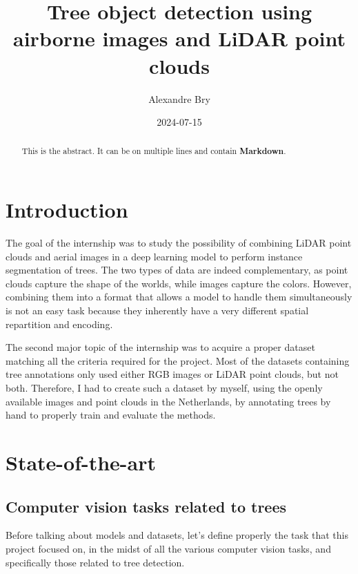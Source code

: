 \documentclass[
]{report}
\title{Tree object detection using airborne images and LiDAR point
clouds}
\author{Alexandre Bry}
\date{2024-07-15}
\renewcommand*\contentsname{Table of contents}
\newcommand\contentsname{Table of contents}
\begin{document}
\maketitle
\begin{abstract}
This is the abstract. It can be on multiple lines and contain
\textbf{Markdown}.
\end{abstract}

\renewcommand*\contentsname{Table of contents}
{
\hypersetup{linkcolor=}
\setcounter{tocdepth}{2}
\tableofcontents
}

\chapter*{Introduction}\label{introduction}

The goal of the internship was to study the possibility of combining
LiDAR point clouds and aerial images in a deep learning model to perform
instance segmentation of trees. The two types of data are indeed
complementary, as point clouds capture the shape of the worlds, while
images capture the colors. However, combining them into a format that
allows a model to handle them simultaneously is not an easy task because
they inherently have a very different spatial repartition and encoding.

The second major topic of the internship was to acquire a proper dataset
matching all the criteria required for the project. Most of the datasets
containing tree annotations only used either RGB images or LiDAR point
clouds, but not both. Therefore, I had to create such a dataset by
myself, using the openly available images and point clouds in the
Netherlands, by annotating trees by hand to properly train and evaluate
the methods.

\chapter{State-of-the-art}\label{state-of-the-art}

\section{Computer vision tasks related to
trees}\label{computer-vision-tasks-related-to-trees}

Before talking about models and datasets, let's define properly the task
that this project focused on, in the midst of all the various computer
vision tasks, and specifically those related to tree detection.
\end{document}
